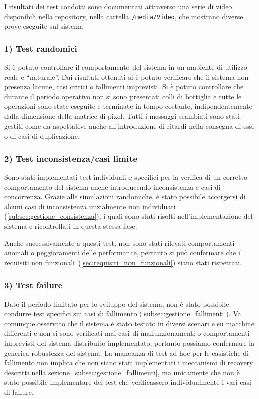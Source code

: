 \documentclass[12pt, a4paper]{report}
\begin{document}
I risultati dei test condotti sono documentati attraverso una serie di video disponibili nella repository, nella cartella \texttt{/media/Video}, che mostrano diverse prove eseguite sul sistema

\subsubsection{1) Test randomici}

Si \`e potuto controllare il comportamento del sistema in un ambiente di utilizzo reale e ``naturale''.
Dai risultati ottenuti si \`e potuto verificare che il sistema non presenza lacune, casi critici o fallimenti imprevisti. Si \`e potuto controllare che durante il periodo operativo non si sono presentati colli di bottiglia e tutte le operazioni sono state eseguite e terminate in tempo costante, indipendentemente dalla dimensione della matrice di pixel.
Tutti i messaggi scambiati sono stati gestiti come da aspettative anche all'introduzione di ritardi nella consegna di essi o di casi di duplicazione.

\subsubsection{2) Test inconsistenza/casi limite}

Sono stati implementati test individuali e specifici per la verifica di un corretto comportamento del sistema anche introducendo inconsistenza e casi di concorrenza.
Grazie alle simulazioni randomiche, \`e stato possibile accorgersi di alcuni casi di inconsistenza inizialmente non individuati (\ref{subsec:gestione_consistenza}), i quali sono stati risolti nell'implementazione del sistema e ricontrollati in questa stessa fase.

Anche successivamente a questi test, non sono stati rilevati comportamenti anomali o peggioramenti delle performance, pertanto si pu\`o confermare che i requisiti non funzionali~(\ref{sec:requisiti_non_funzionali}) siano stati rispettati.

\subsubsection{3) Test failure}

Dato il periodo limitato per lo sviluppo del sistema, non \`e stato possibile condurre test specifici sui casi di fallimento (\ref{subsec:gestione_fallimenti}).
Va comunque osservato che il sistema \`e stato testato in diversi scenari e su macchine differenti e non si sono verificati mai casi di malfunzionamenti o comportamenti imprevisti del sistema distribuito implementato, pertanto possiamo confermare la generica robustezza del sistema.
La mancanza di test ad-hoc per le casistiche di fallimento non implica che non siano stati implementati i meccanismi di recovery descritti nella sezione~\ref{subsec:gestione_fallimenti}, ma unicamente che non \`e stato possibile implementare dei test che verificassero individualmente i vari casi di failure.
\end{document}
